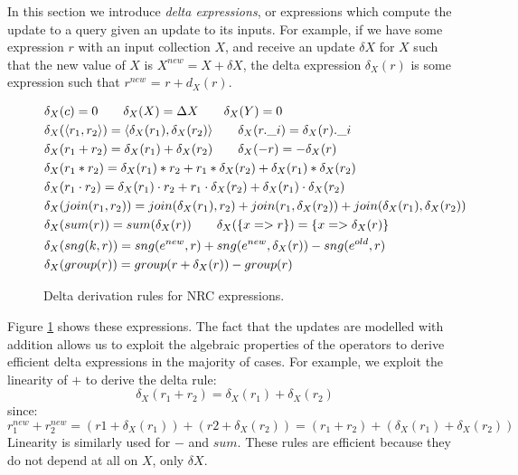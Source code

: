 {{{In this section we introduce \textit{delta expressions}, or expressions which compute the update to a query given an update to its inputs. For example, if we have some expression $r$ with an input collection $X$, and receive an update $\delta X$ for $X$ such that the new value of $X$ is $X^{new} = X + \delta X$, the delta expression $\delta_X(r)$ is some expression such that $r^{new}$ = $r + d_X(r)$.

\begin{figure}
\begin{equation*}
\begin{aligned}
&\delta_X(c) = 0 \qquad \delta_X(X) = \Delta X \qquad \delta_X(Y) = 0\\
&\delta_X(\langle r_1, r_2 \rangle) = \langle \delta_X(r_1), \delta_X(r_2) \rangle \qquad \delta_X(r.\_i) = \delta_X(r).\_i\\
&\delta_X(r_1 + r_2) = \delta_X(r_1) + \delta_X(r_2) \qquad \delta_X(-r) = -\delta_X(r)\\
&\delta_X(r_1 * r_2) = \delta_X(r_1)*r_2 + r_1*\delta_X(r_2) + \delta_X(r_1) * \delta_X(r_2) \\
&\delta_X(r_1 \cdot r_2) = \delta_X(r_1) \cdot r_2 + r_1 \cdot \delta_X(r_2) + \delta_X(r_1) \cdot \delta_X(r_2) \\
&\delta_X(join(r_1,r_2)) = join(\delta_X(r_1),r_2) + join(r_1,\delta_X(r_2)) + join(\delta_X(r_1),\delta_X(r_2)) \\
&\delta_X(sum(r)) = sum(\delta_X(r)) \qquad \delta_X(\{x => r\}) = \{x => \delta_X(r)\} \\
&\delta_X(sng(k,r)) = sng(e^{new},r)  + sng(e^{new},\delta_X(r)) - sng(e^{old},r) \\
&\delta_X(group(r)) = group(r + \delta_X(r)) - group(r)
\end{aligned}
\qquad
\end{equation*}
\caption{Delta derivation rules for NRC expressions.}
\label{deltaexprs}
\end{figure}

Figure \ref{deltaexprs} shows these expressions. The fact that the updates are modelled with addition allows us to exploit the algebraic properties of the operators to derive efficient delta expressions in the majority of cases. For example, we exploit the linearity of $+$ to derive the delta rule:
\[\delta_X(r_1 + r_2) = \delta_X(r_1) + \delta_X(r_2)\]
since: 
\[r_1^{new} + r_2^{new} = (r1 + \delta_X(r_1)) + (r2 + \delta_X(r_2)) = (r_1 + r_2) + (\delta_X(r_1) + \delta_X(r_2))\]
Linearity is similarly used for $-$ and $sum$. These rules are efficient because they do not depend at all on $X$, only $\delta X$.

}}}
